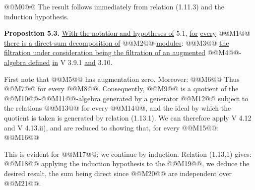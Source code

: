 @@M0@@
The result follows immediately from relation (1.11.3) and the induction hypothesis.

\textbf{Proposition 5.3.} \uline{With the notation and hypotheses of} 5.1, \uline{for} \uline{every} @@M1@@ \uline{there is a direct-sum decomposition of} @@M2@@-\uline{modules}:
@@M3@@
\uline{the filtration under consideration being the filtration of an augmented} @@M4@@-\uline{algebra defined} \uline{in} V 3.9.1 \uline{and} 3.10.

First note that @@M5@@ has augmentation zero. Moreover:
@@M6@@
Thus @@M7@@ for every @@M8@@. Consequently, @@M9@@ is a quotient of the @@M10@@-@@M11@@-algebra generated by a generator @@M12@@ subject to the relations @@M13@@ for every @@M14@@, and the ideal by which the quotient is taken is generated by relation (1.13.1). We can therefore apply V 4.12 and V 4.13.ii), and are reduced to showing that, for every @@M15@@:
@@M16@@

This is evident for @@M17@@; we continue by induction. Relation (1.13.1) gives:
@@M18@@
applying the induction hypothesis to the @@M19@@, we deduce the desired result, the sum being direct since @@M20@@ are independent over @@M21@@.

